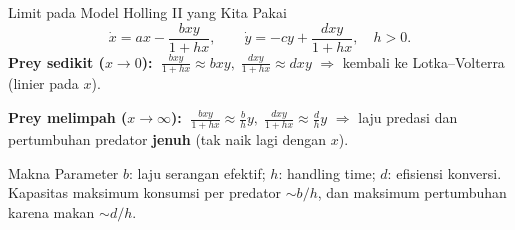 \documentclass[aspectratio=32]{beamer}
\begin{document}
\begin{frame}{Limit pada Model Holling II yang Kita Pakai}
  \small
  \[
    \dot{x}= ax - \frac{bxy}{1+h x},\qquad
    \dot{y}= -cy + \frac{dxy}{1+h x},\quad h>0.
  \]
  \vspace{0.4em}
  \textbf{Prey sedikit ($x\to 0$):} 
  \(\;\frac{bxy}{1+hx}\approx bxy,\;\frac{dxy}{1+hx}\approx dxy\)
  \(\Rightarrow\) kembali ke Lotka–Volterra (linier pada $x$).
  \vspace{0.3em}

  \textbf{Prey melimpah ($x\to\infty$):} 
  \(\;\frac{bxy}{1+hx}\approx \frac{b}{h}y,\;
    \frac{dxy}{1+hx}\approx \frac{d}{h}y\)
  \(\Rightarrow\) laju predasi dan pertumbuhan predator \textbf{jenuh} (tak naik lagi dengan $x$).
  \vspace{0.4em}

  \begin{block}{Makna Parameter}
    $b$: laju serangan efektif; \quad
    $h$: handling time; \quad
    $d$: efisiensi konversi. \\
    Kapasitas maksimum konsumsi per predator $\sim b/h$, 
    dan maksimum pertumbuhan karena makan $\sim d/h$.
  \end{block}
\end{frame}
\end{document}
